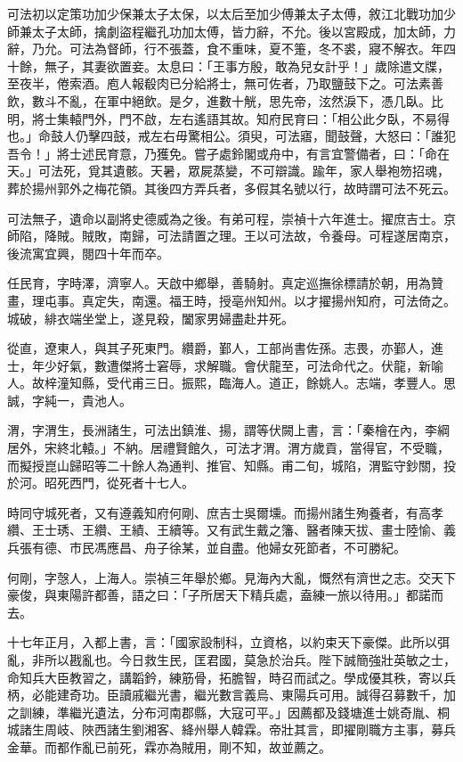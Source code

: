 \begin{pinyinscope}
可法初以定策功加少保兼太子太保，以太后至加少傅兼太子太傅，敘江北戰功加少師兼太子太師，擒劇盜程繼孔功加太傅，皆力辭，不允。後以宮殿成，加太師，力辭，乃允。可法為督師，行不張蓋，食不重味，夏不箑，冬不裘，寢不解衣。年四十餘，無子，其妻欲置妾。太息曰：「王事方殷，敢為兒女計乎！」歲除遣文牒，至夜半，倦索酒。庖人報殽肉已分給將士，無可佐者，乃取鹽鼓下之。可法素善飲，數斗不亂，在軍中絕飲。是夕，進數十觥，思先帝，泫然淚下，憑几臥。比明，將士集轅門外，門不啟，左右遙語其故。知府民育曰：「相公此夕臥，不易得也。」命鼓人仍擊四鼓，戒左右毋驚相公。須臾，可法寤，聞鼓聲，大怒曰：「誰犯吾令！」將士述民育意，乃獲免。嘗孑處鈴閣或舟中，有言宜警備者，曰：「命在天。」可法死，覓其遺骸。天暑，眾屍蒸變，不可辯識。踰年，家人舉袍笏招魂，葬於揚州郭外之梅花領。其後四方弄兵者，多假其名號以行，故時謂可法不死云。

可法無子，遺命以副將史德威為之後。有弟可程，崇禎十六年進士。擢庶吉士。京師陷，降賊。賊敗，南歸，可法請置之理。王以可法故，令養母。可程遂居南京，後流寓宜興，閱四十年而卒。

任民育，字時澤，濟寧人。天啟中鄉舉，善騎射。真定巡撫徐標請於朝，用為贊畫，理屯事。真定失，南還。福王時，授亳州知州。以才擢揚州知府，可法倚之。城破，緋衣端坐堂上，遂見殺，闔家男婦盡赴井死。

從直，遼東人，與其子死東門。纘爵，鄞人，工部尚書佐孫。志畏，亦鄞人，進士，年少好氣，數遭傑將士窘辱，求解職。會伏龍至，可法命代之。伏龍，新喻人。故梓潼知縣，受代甫三日。振熙，臨海人。道正，餘姚人。志端，孝豐人。思誠，字純一，貴池人。

渭，字渭生，長洲諸生，可法出鎮淮、揚，謂等伏闕上書，言：「秦檜在內，李綱居外，宋終北轅。」不納。居禮賢館久，可法才渭。渭方歲貢，當得官，不受職，而擬授崑山歸昭等二十餘人為通判、推官、知縣。甫二旬，城陷，渭監守鈔關，投於河。昭死西門，從死者十七人。

時同守城死者，又有遵義知府何剛、庶吉士吳爾壎。而揚州諸生殉養者，有高孝纘、王士琇、王纘、王績、王續等。又有武生戴之籓、醫者陳天拔、畫士陸愉、義兵張有德、市民馮應昌、舟子徐某，並自盡。他婦女死節者，不可勝紀。

何剛，字愨人，上海人。崇禎三年舉於鄉。見海內大亂，慨然有濟世之志。交天下豪俊，與東陽許都善，語之曰：「子所居天下精兵處，盍練一旅以待用。」都諾而去。

十七年正月，入都上書，言：「國家設制科，立資格，以約束天下豪傑。此所以弭亂，非所以戡亂也。今日救生民，匡君國，莫急於治兵。陛下誠簡強壯英敏之士，命知兵大臣教習之，講韜鈐，練筋骨，拓膽智，時召而試之。學成優其秩，寄以兵柄，必能建奇功。臣讀戚繼光書，繼光數言義烏、東陽兵可用。誠得召募數千，加之訓練，準繼光遺法，分布河南郡縣，大寇可平。」因薦都及錢塘進士姚奇胤、桐城諸生周岐、陜西諸生劉湘客、絳州舉人韓霖。帝壯其言，即擢剛職方主事，募兵金華。而都作亂已前死，霖亦為賊用，剛不知，故並薦之。


\end{pinyinscope}
